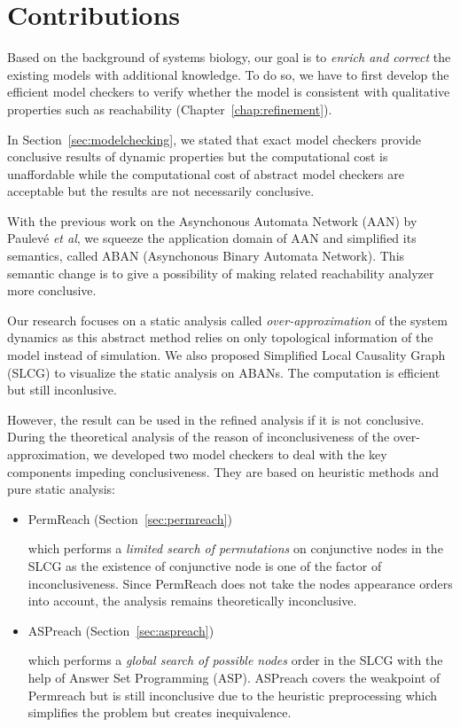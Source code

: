 \section{Contributions}

Based on the background of systems biology, our goal is to \textit{enrich and correct} the existing models with additional knowledge.
To do so, we have to first develop the efficient model checkers to verify whether the model is consistent with qualitative properties such as reachability (Chapter~\ref{chap:refinement}).

In Section~\ref{sec:modelchecking}, we stated that exact model checkers provide conclusive results of dynamic properties but the computational cost is unaffordable while the computational cost of abstract model checkers are acceptable but the results are not necessarily conclusive.

With the previous work on the Asynchonous Automata Network (AAN) by Paulev\'e \textit{et al},
we squeeze the application domain of AAN and simplified its semantics, called ABAN (Asynchonous Binary Automata Network).
This semantic change is to give a possibility of making related reachability analyzer more conclusive.

Our research focuses on a static analysis called \textit{over-approximation} of the system dynamics as this abstract method relies on only topological information of the model instead of simulation.
We also proposed Simplified Local Causality Graph (SLCG) to visualize the static analysis on ABANs.
The computation is efficient but still inconlusive.

However, the result can be used in the refined analysis if it is not conclusive.
During the theoretical analysis of the reason of inconclusiveness of the over-approximation, we developed two model checkers to deal with the key components impeding conclusiveness.
They are based on heuristic methods and pure static analysis:
\begin{itemize}
    \item PermReach (Section~\ref{sec:permreach})
    
        which performs a \textit{limited search of permutations} on conjunctive nodes in the SLCG as the existence of conjunctive node is one of the factor of inconclusiveness.
        Since PermReach does not take the nodes appearance orders into account, the analysis remains theoretically inconclusive.
    \item ASPreach (Section~\ref{sec:aspreach})
        
        which performs a \textit{global search of possible nodes} order in the SLCG with the help of Answer Set Programming (ASP).
        ASPreach covers the weakpoint of Permreach but is still inconclusive due to the heuristic preprocessing which simplifies the problem but creates inequivalence.
\end{itemize}

